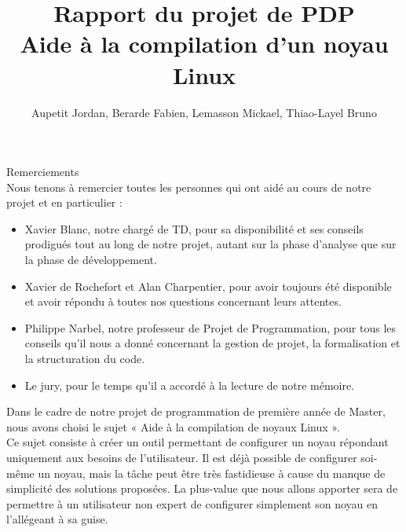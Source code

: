 \documentclass[16pts]{report}
\title{Rapport du projet de PDP \\ Aide à la compilation d'un noyau Linux}
\author{Aupetit Jordan, Berarde Fabien, Lemasson Mickael, Thiao-Layel Bruno}
\begin{document}
\maketitle
\clearpage

Remerciements\\

Nous tenons à remercier toutes les personnes qui ont aidé au cours de notre 
projet et en particulier :\\

\begin{itemize}
  \item Xavier Blanc, notre chargé de TD, pour sa disponibilité et ses conseils 
  prodigués tout au long de notre projet, autant sur la phase d'analyse 
  que sur la phase de développement.\\

   \item Xavier de Rochefort et Alan Charpentier, pour avoir toujours été 
  disponible et avoir répondu à toutes nos questions concernant leurs 
  attentes. \\

  \item Philippe Narbel, notre professeur de Projet de Programmation, pour 
  tous les conseils qu'il nous a donné concernant la gestion de projet, la 
  formalisation et la structuration du code.\\

\item Le jury, pour le temps qu'il a accordé à la lecture de notre 
  mémoire.\\

\end{itemize}

\tableofcontents
\clearpage

\nocite{*}

Dans le cadre de notre projet de programmation de première année de Master, 
nous avons choisi le sujet « Aide à la compilation de noyaux Linux ».
\\

Ce sujet consiste à créer un outil permettant de configurer un noyau répondant 
uniquement aux besoins de l'utilisateur. Il est déjà possible de 
configurer soi-même un noyau, mais la tâche peut être très fastidieuse 
à cause du manque de simplicité des solutions proposées. La plus-value 
que nous allons apporter sera de permettre à un utilisateur non expert 
de configurer simplement son noyau en l'allégeant à sa guise.
\\
\end{document}
